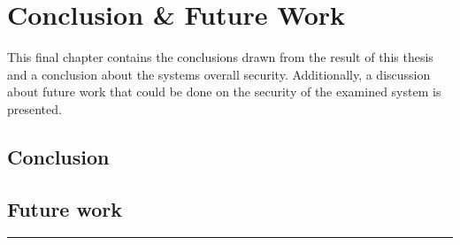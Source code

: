 \chapter{Conclusion \& Future Work} \label{ch:conclusion}
This final chapter contains the conclusions drawn from the result of this thesis and a conclusion about the systems overall security. Additionally, a discussion about future work that could be done on the security of the examined system is presented.

\section{Conclusion}
\todo

\section{Future work}
\todo

\noindent\rule{\textwidth}{0.4mm}

